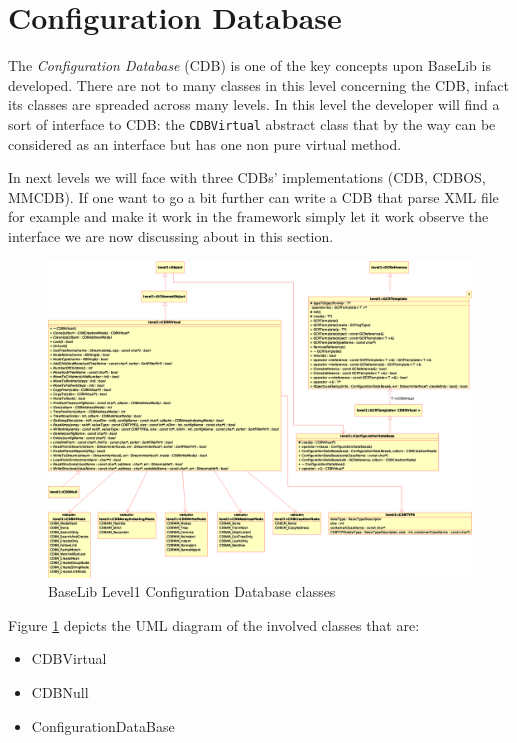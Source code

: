 \section{Configuration Database}
The \textit{Configuration Database} (CDB) is one of the key concepts upon BaseLib is developed. There are not to many classes in this level concerning the CDB, infact its classes are spreaded across many levels. In this level the developer will find a sort of interface to CDB: the \texttt{CDBVirtual} abstract class that by the way can be considered as an interface but has one non pure virtual method.

In next levels we will face with three CDBs' implementations (CDB, CDBOS, MMCDB). If one want to go a bit further can write a CDB that parse XML file for example and make it work in the framework simply let it work observe the interface we are now discussing about in this section.

\begin{figure}[h!]
 \begin{center}
  \includegraphics[width=\textwidth]{level1/level1-CDB.eps}
  \caption{BaseLib Level1 Configuration Database classes}
  \label{f:level1:CDB}
 \end{center}
\end{figure}

Figure \ref{f:level1:CDB} depicts the UML diagram of the involved classes that are:
\begin{itemize}
 \item CDBVirtual
 \item CDBNull
 \item ConfigurationDataBase
\end{itemize}



